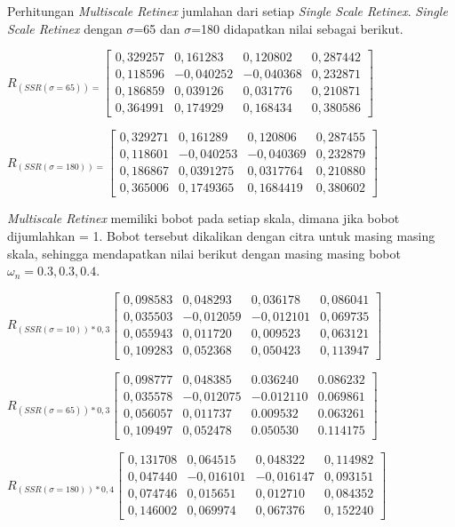\noindent Perhitungan \emph{Multiscale Retinex} jumlahan dari setiap \emph{Single Scale Retinex}. \emph{Single Scale Retinex} dengan $\sigma$=65 dan $\sigma$=180 didapatkan nilai sebagai berikut.

\noindent
$R_{(SSR(\sigma=65))=}\left[
\begin{matrix}
0,329257&	0,161283&	0,120802&	0,287442\\
0,118596&	-0,040252&	-0,040368&	0,232871\\
0,186859&	0,039126&	0,031776&	0,210871\\
0,364991&	0,174929&	0,168434&	0,380586
\end{matrix}
\right]$

\noindent
$R_{(SSR(\sigma=180))=}\left[
\begin{matrix}
0,329271&	0,161289&	0,120806&	0,287455\\
0,118601&	-0,040253&	-0,040369&	0,232879\\
0,186867&	0,0391275&	0,0317764&	0,210880\\
0,365006&	0,1749365&	0,1684419&	0,380602
\end{matrix}
\right]$

\noindent \emph{Multiscale Retinex} memiliki bobot pada setiap skala, dimana jika bobot dijumlahkan = 1. Bobot tersebut dikalikan dengan citra untuk masing masing skala, sehingga mendapatkan nilai berikut dengan masing masing bobot$\omega_n=0.3, 0.3, 0.4$.

\noindent
$R_{(SSR(\sigma=10))*0,3}\left[
\begin{matrix}
0,098583&	0,048293&	0,036178&	0,086041\\
0,035503&	-0,012059&	-0,012101&	0,069735\\
0,055943&	0,011720&	0,009523&	0,063121\\
0,109283&	0,052368&	0,050423&	0,113947
\end{matrix}
\right]$

\noindent
$R_{(SSR(\sigma=65))*0,3}\left[
\begin{matrix}
0,098777&	0,048385&	0.036240&	0.086232\\
0,035578&	-0,012075&	-0.012110&	0.069861\\
0,056057&	0,011737&	0.009532&	0.063261\\
0,109497&	0,052478&	0.050530&	0.114175
\end{matrix}
\right]$

\noindent
$R_{(SSR(\sigma=180))*0,4}\left[
\begin{matrix}
0,131708&	0,064515&	0,048322&	0,114982\\
0,047440&	-0,016101&	-0,016147&	0,093151\\
0,074746&	0,015651&	0,012710&	0,084352\\
0,146002&	0,069974&	0,067376&	0,152240
\end{matrix}
\right]$

